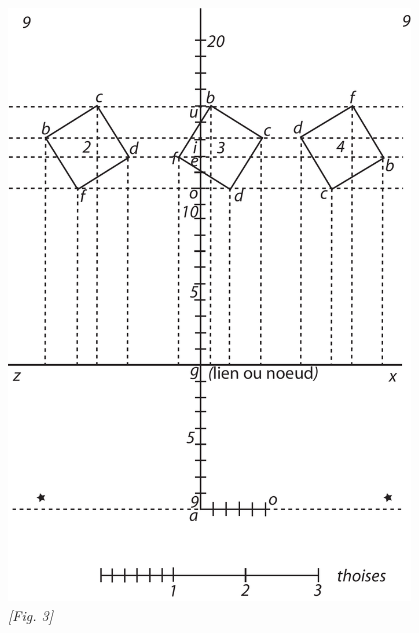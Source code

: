 \begin{center}               
                \includegraphics[width=0.8\textwidth]{images/T9-Desargues}\\\textit{[Fig. 3]}
                        \end{center}
                    